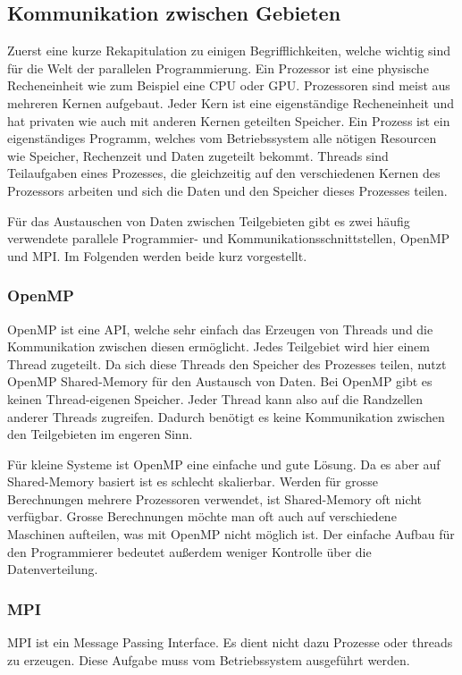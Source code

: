 %
%
%
%
\subsection{Kommunikation zwischen Gebieten
\label{parallelisierung:sub:Interprozess}}
Zuerst eine kurze Rekapitulation zu einigen Begrifflichkeiten, welche wichtig sind für die Welt der parallelen Programmierung.
Ein Prozessor ist eine physische Recheneinheit wie zum Beispiel eine CPU oder GPU.
Prozessoren sind meist aus mehreren Kernen aufgebaut.
Jeder Kern ist eine eigenständige Recheneinheit und hat privaten wie auch mit anderen Kernen geteilten Speicher.
Ein Prozess ist ein eigenständiges Programm, welches vom Betriebssystem alle nötigen Resourcen wie Speicher, Rechenzeit und Daten zugeteilt bekommt.
Threads sind Teilaufgaben eines Prozesses, die gleichzeitig auf den verschiedenen Kernen des Prozessors arbeiten und sich die Daten und den Speicher dieses Prozesses teilen.

Für das Austauschen von Daten zwischen Teilgebieten gibt es zwei häufig verwendete parallele Programmier- und Kommunikationsschnittstellen, OpenMP und MPI.
Im Folgenden werden beide kurz vorgestellt.

\subsubsection{OpenMP}
OpenMP ist eine API, welche sehr einfach das Erzeugen von Threads und die Kommunikation zwischen diesen ermöglicht.
Jedes Teilgebiet wird hier einem Thread zugeteilt. 
Da sich diese Threads den Speicher des Prozesses teilen, nutzt OpenMP Shared-Memory für den Austausch von Daten.
Bei OpenMP gibt es keinen Thread-eigenen Speicher.
Jeder Thread kann also auf die Randzellen anderer Threads zugreifen.
Dadurch benötigt es keine Kommunikation zwischen den Teilgebieten im engeren Sinn.

Für kleine Systeme ist OpenMP eine einfache und gute Lösung.
Da es aber auf Shared-Memory basiert ist es schlecht skalierbar.
Werden für grosse Berechnungen mehrere Prozessoren verwendet, ist Shared-Memory oft nicht verfügbar.
Grosse Berechnungen möchte man oft auch auf verschiedene Maschinen aufteilen, was mit OpenMP nicht möglich ist.
Der einfache Aufbau für den Programmierer bedeutet außerdem weniger Kontrolle über die Datenverteilung.

\subsubsection{MPI}
MPI ist ein Message Passing Interface.
Es dient nicht dazu Prozesse oder threads zu erzeugen.
Diese Aufgabe muss vom Betriebssystem ausgeführt werden.

